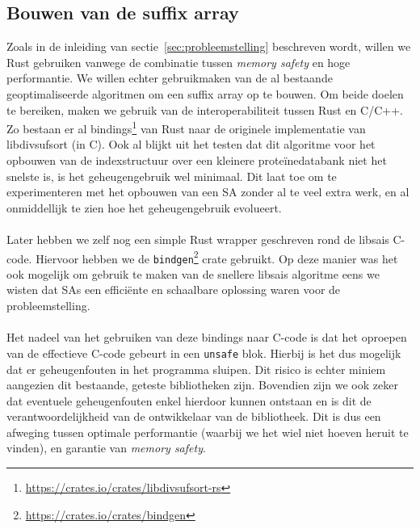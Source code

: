 \subsection{Bouwen van de suffix array}\label{subsec:bouwen-van-de-suffix-array}
Zoals in de inleiding van sectie~\ref{sec:probleemstelling} beschreven wordt, willen we Rust gebruiken vanwege de combinatie tussen \textit{memory safety} en hoge performantie.
We willen echter gebruikmaken van de al bestaande geoptimaliseerde algoritmen om een suffix array op te bouwen.
Om beide doelen te bereiken, maken we gebruik van de interoperabiliteit tussen Rust en C/C++.
Zo bestaan er al bindings\footnote{\url{https://crates.io/crates/libdivsufsort-rs}} van Rust naar de originele implementatie van libdivsufsort\cite{libdivsufsort} (in C).
Ook al blijkt uit het testen dat dit algoritme voor het opbouwen van de indexstructuur over een kleinere proteïnedatabank niet het snelste is, is het geheugengebruik wel minimaal.
Dit laat toe om te experimenteren met het opbouwen van een SA zonder al te veel extra werk, en al onmiddellijk te zien hoe het geheugengebruik evolueert.
\\ \\
Later hebben we zelf nog een simple Rust wrapper geschreven rond de libsais C-code.
Hiervoor hebben we de \texttt{bindgen}\footnote{\url{https://crates.io/crates/bindgen}} crate gebruikt.
Op deze manier was het ook mogelijk om gebruik te maken van de snellere libsais algoritme eens we wisten dat SAs een efficiënte en schaalbare oplossing waren voor de probleemstelling.
\\ \\
Het nadeel van het gebruiken van deze bindings naar C-code is dat het oproepen van de effectieve C-code gebeurt in een \texttt{unsafe} blok.
Hierbij is het dus mogelijk dat er geheugenfouten in het programma sluipen.
Dit risico is echter miniem aangezien dit bestaande, geteste bibliotheken zijn.
Bovendien zijn we ook zeker dat eventuele geheugenfouten enkel hierdoor kunnen ontstaan en is dit de verantwoordelijkheid van de ontwikkelaar van de bibliotheek.
Dit is dus een afweging tussen optimale performantie (waarbij we het wiel niet hoeven heruit te vinden), en garantie van \textit{memory safety}.

